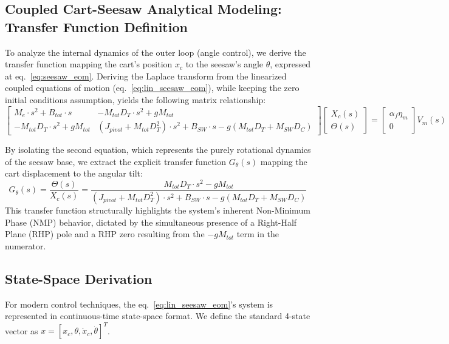 \documentclass[11pt,a4paper]{article}
\begin{document}
\subsection{Coupled Cart-Seesaw Analytical Modeling: Transfer Function Definition}\label{sub:seesaw_transfer_function}
To analyze the internal dynamics of the outer loop (angle control), we derive the transfer function mapping the cart's position $x_c$ to the seesaw's angle $\theta$, expressed at eq.~\ref{eq:seesaw_eom}. Deriving the Laplace transform from the linearized coupled equations of motion (eq.~\ref{eq:lin_seesaw_eom}), while keeping the zero initial conditions assumption, yields the following matrix relationship:
\begin{equation}
\begin{bmatrix} 
M_e \cdot s^2 + B_{tot} \cdot s & -M_{tot}D_T \cdot s^2 + gM_{tot} \\ 
-M_{tot}D_T \cdot s^2 + gM_{tot} & (J_{pivot} + M_{tot}D_T^2) \cdot s^2 + B_{SW} \cdot s - g(M_{tot}D_T + M_{SW}D_C) 
\end{bmatrix} 
\begin{bmatrix} X_c(s) \\ \Theta(s) \end{bmatrix} 
= \begin{bmatrix} \alpha_f \eta_m \\ 0 \end{bmatrix} V_m(s)
\label{eq:coupled_matrix}
\end{equation}

By isolating the second equation, which represents the purely rotational dynamics of the seesaw base, we extract the explicit transfer function $G_\theta(s)$ mapping the cart displacement to the angular tilt:
\begin{equation}
G_\theta(s) = \frac{\Theta(s)}{X_c(s)} = \frac{M_{tot}D_T \cdot s^2 - gM_{tot}}{(J_{pivot} + M_{tot}D_T^2) \cdot s^2 + B_{SW} \cdot s - g(M_{tot}D_T + M_{SW}D_C)}
\label{eq:tf_theta}
\end{equation}
This transfer function structurally highlights the system's inherent Non-Minimum Phase (NMP) behavior, dictated by the simultaneous presence of a Right-Half Plane (RHP) pole and a RHP zero resulting from the $-gM_{tot}$ term in the numerator.

\subsection{State-Space Derivation}\label{sub:seesaw_state_space_def}
For modern control techniques, the eq.~\ref{eq:lin_seesaw_eom}'s system is represented in continuous-time state-space format. We define the standard 4-state vector as $x = [x_c, \theta, \dot{x}_c, \dot{\theta}]^T$.
\end{document}
